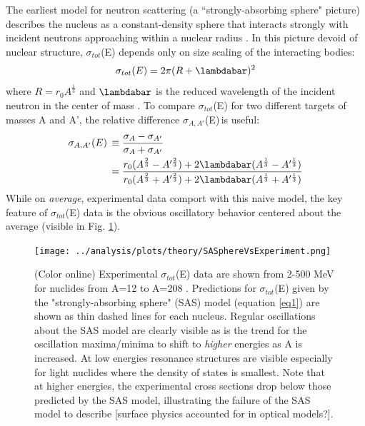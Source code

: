 \documentclass[twocolumn,secnumarabic,amssymb, nobibnotes, aps, prl,
superscriptaddress, nobalancelastpage]{revtex4}
\newcommand{\totEs}{\ensuremath{\sigma_{tot}}(E)\,\,}
\newcommand{\totRDs}{\ensuremath{\sigma_{A,A'}}(E)\,}
\begin{document}
The earliest model for neutron scattering (a ``strongly-absorbing sphere"
picture) describes the nucleus as a constant-density sphere that interacts
strongly with incident neutrons approaching within a nuclear radius
\cite{Feshbach1949}. In this picture devoid of nuclear structure, \totEs depends
only on size scaling of the interacting bodies:
\begin{equation} \label{eq1}
    \sigma_{tot}(E) = 2\pi(R + \lambdabar)^{2}
\end{equation}
where $R=r_{0}A^{\frac{1}{3}}$ and $\lambdabar$ is the reduced wavelength
of the incident neutron in the center of mass \cite{Fernbach1949, Satchler1980}. 
To compare \totEs for two different targets of masses A and A', the relative
difference \totRDs is useful:
\begin{equation} \label{eq2}
    \begin{split}
        \totRDs & \equiv
    \frac{\sigma_{A}-\sigma_{A'}}{\sigma_{A}+\sigma_{A'}} \\
    & =
        \frac{r_{0}(A^{\frac{2}{3}}-A'^{\frac{2}{3}}) +
        2\lambdabar(A^{\frac{1}{3}}-A'^{\frac{1}{3}})}
        {r_{0}(A^{\frac{2}{3}}+A'^{\frac{2}{3}}) +
        2\lambdabar(A^{\frac{1}{3}}+A'^{\frac{1}{3}})}
    \end{split}
\end{equation}
While on \textit{average}, experimental data comport with this naive
model, the key feature of \totEs data is the obvious oscillatory
behavior centered about the average (visible in Fig.
\ref{SASphereVsExperiment}).

\begin{figure}
    \texttt{[image: ../analysis/plots/theory/SASphereVsExperiment.png]}
    \caption{(Color online) Experimental \totEs data are shown from 2-500
        MeV for nuclides from A=12 to A=208
        \cite{Finlay1993, Schwartz1974, Poenitz1983, Abfalterer2000, Abfalterer2001}.
        Predictions for \totEs given by the "strongly-absorbing sphere" (SAS) model (equation 
        \ref{eq1}) are shown as thin dashed lines for each nucleus.
        Regular oscillations about the SAS model are clearly visible
        as is the trend for the oscillation
        maxima/minima to shift to \textit{higher} energies as A is increased. At low energies 
        resonance structures are visible especially for light nuclides where the
        density of states is smallest. Note that at higher energies, the experimental
        cross sections drop below those predicted by the SAS model, illustrating
    the failure of the SAS model to describe [surface physics accounted for in
optical models?].}
    \label{SASphereVsExperiment}
\end{figure}
\end{document}
